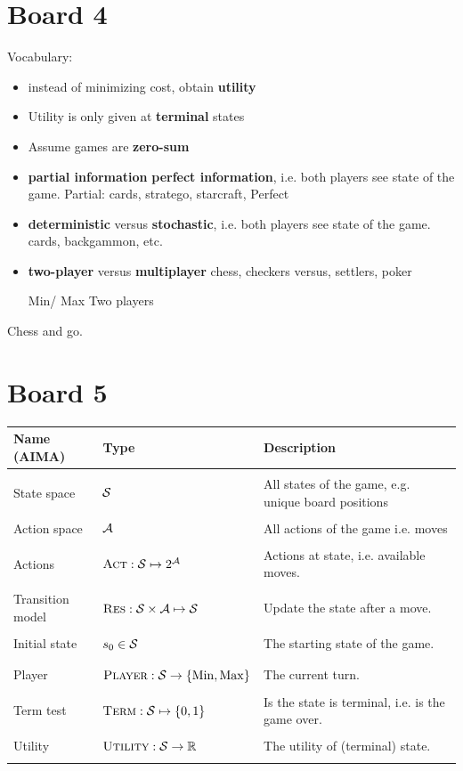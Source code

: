 \documentclass[11pt]{article}
\begin{document}
\section{Board 4}
Vocabulary: 


\begin{itemize}
\item  instead of minimizing cost, obtain \textbf{utility} 
\item  Utility is only given at \textbf{terminal} states
\item Assume games are \textbf{zero-sum}
\item \textbf{partial information} \textbf{perfect information}, i.e. both players see state of the game. Partial: cards, stratego, starcraft, Perfect
\item \textbf{deterministic} versus \textbf{stochastic}, i.e. both players see state of the game. cards, backgammon, etc. 
\item \textbf{two-player} versus \textbf{multiplayer} chess, checkers versus, settlers, poker

Min/ Max Two players 

\end{itemize}

Chess and go. 

\section{Board 5}


 \air
\begin{center}
\begin{tabularx}{\linewidth}{llX}
  \toprule
  Name (AIMA) & Type & Description \\
  \midrule
\\
 State space & $\mathcal{S}$ & All states of the game, e.g. unique board positions \\\\
 Action space & $\mathcal{A}$& All actions of the game i.e. moves\\\\
 Actions&  $\mathrm{\textsc{Act}}: \mathcal{S} \mapsto 2^{\mathcal{A}}$ & Actions at state, i.e. available moves. \\\\
 Transition model&  $\mathrm{\textsc{Res}}:  \mathcal{S} \times \mathcal{A} \mapsto \mathcal{S} $ &  Update the state after a move.  \\\\
 Initial state &  $s_0 \in \mathcal{S}$ & The starting state of the game.  \\\\
 \midrule \\
 Player& $\mathrm{\textsc{Player}}: \mathcal{S} \rightarrow \{\mathrm{Min}, \mathrm{Max}\}$ &  The current turn. \\\\
 Term test& $\mathrm{\textsc{Term}}: \mathcal{S} \mapsto \{0, 1\} $ &  Is the state is terminal, i.e. is the game over. \\\\
 Utility & $\mathrm{\textsc{Utility}}: \mathcal{S} \rightarrow \mathbb{R}$ & The utility  of (terminal) state. \\\\
 \bottomrule
\end{tabularx}
\end{center}
\end{document}
